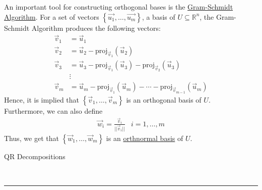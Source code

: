 \documentclass{article}
\newcommand{\header}[1]{\begin{large}\noindent #1\end{large}\\\rule{\textwidth}{0.5pt}}
\newcommand{\gap}{\medskip\\}
\newcommand{\curly}[1]{\left\{#1\right\}}
\newcommand{\proj}[2]{{}\textrm{proj}_{#1}\left(#2\right)}
\begin{document}
An important tool for constructing orthogonal bases is the 
\underline{Gram-Schmidt Algorithm}. For a set of vectors $\curly{\vec{u_1}, \ldots, \vec{u_m}}$,
a basis of $U \subseteq \mathbb{R}^n$, the Gram-Schmidt Algorithm produces
the following vectors:
\begin{align*}
    \vec{v}_1 &= \vec{u}_1\\
    \vec{v}_2 &= \vec{u}_2 - \proj{\vec{v}_1}{\vec{u}_2}\\
    \vec{v}_3 &= \vec{u}_3 - \proj{\vec{v}_1}{\vec{u}_3} - \proj{\vec{v}_2}{\vec{u}_3}\\
    &\vdots\\
    \vec{v}_m &= \vec{u}_m - \proj{\vec{v}_1}{\vec{u}_m} - \cdots - \proj{\vec{v}_{m - 1}}{\vec{u}_m}
\end{align*}
Hence, it is implied that $\curly{\vec{v}_1, \ldots, \vec{v}_m}$
is an orthogonal basis of $U$.
\gap
Furthermore, we can also define
\begin{align*}
    \vec{w}_i = \frac{\vec{v}_i}{||\vec{v}_i||} & i = 1, \ldots, m
\end{align*}
Thus, we get that $\curly{\vec{w}_1 , \ldots, \vec{w}_m}$ is an 
\underline{orthnormal basis} of $U$.

\pagebreak

\header{QR Decompositions}
\end{document}
